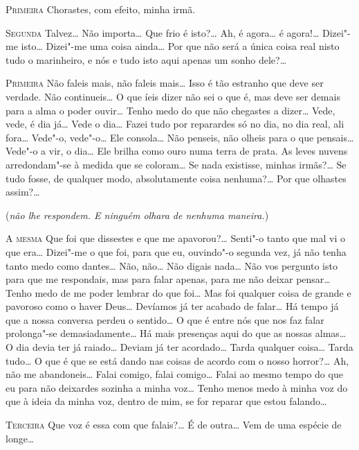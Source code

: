 \textsc{Primeira} Chorastes, com efeito, minha irmã.

\textsc{Segunda} Talvez\ldots{} Não importa\ldots{} 
Que frio é isto?\ldots{} Ah, é agora\ldots{} é
agora!\ldots{} Dizei"-me isto\ldots{} 
Dizei"-me uma coisa ainda\ldots{} Por que não
será a única coisa real nisto tudo o marinheiro, 
e nós e tudo isto aqui apenas um sonho dele?\ldots{} 

\textsc{Primeira} Não faleis mais, não faleis mais\ldots{} 
Isso é tão estranho que deve ser verdade. Não continueis\ldots{} 
O que íeis dizer não sei o que é,
mas deve ser demais para a alma o poder ouvir\ldots{}
Tenho medo do que não chegastes a dizer\ldots{} 
Vede, vede, é dia já\ldots{} Vede o dia\ldots{} 
Fazei tudo por reparardes só no dia, no dia real,
ali fora\ldots{} Vede"-o, vede"-o\ldots{}
Ele consola\ldots{} Não penseis, não olheis para 
o que pensais\ldots{} Vede"-o a vir, o dia\ldots{} 
Ele brilha como ouro numa terra de prata. As leves nuvens
arredondam"-se à medida que se coloram\ldots{}
Se nada existisse, minhas irmãs?\ldots{} 
Se tudo fosse, de qualquer modo, absolutamente coisa nenhuma?\ldots{}
Por que olhastes assim?\ldots{}

(\textit{não lhe respondem. E ninguém olhara de nenhuma maneira.}) 

\textsc{A mesma} Que foi que dissestes e que me apavorou?\ldots{} 
Senti"-o tanto que mal vi o que era\ldots{} Dizei"-me o que
foi, para que eu, ouvindo"-o segunda vez, já não tenha tanto
medo como dantes\ldots{} Não, não\ldots{} Não digais nada\ldots{} 
Não vos pergunto isto para que me respondais, mas para
falar apenas, para me não deixar pensar\ldots{} Tenho medo 
de me poder lembrar do que foi\ldots{} Mas foi qualquer 
coisa de grande e pavoroso como o haver Deus\ldots{} 
Devíamos já ter acabado de falar\ldots{} Há tempo já que a
nossa conversa perdeu o sentido\ldots{} O que é entre nós
que nos faz falar prolonga"-se demasiadamente\ldots{} 
Há mais presenças aqui do que as nossas almas\ldots{}
O dia devia ter já raiado\ldots{} Deviam já ter
acordado\ldots{} Tarda qualquer coisa\ldots{} Tarda 
tudo\ldots{} O que é que se está dando nas coisas de
acordo com o nosso horror?\ldots{} Ah, não me 
abandoneis\ldots{} Falai comigo, falai comigo\ldots{} 
Falai ao mesmo tempo do que eu para não deixardes
sozinha a minha voz\ldots{} Tenho menos medo à minha 
voz do que à ideia da minha voz, dentro de mim, se for 
reparar que estou falando\ldots{}

\textsc{Terceira} Que voz é essa com que falais?\ldots{}
É de outra\ldots{} Vem de uma espécie de longe\ldots{}

